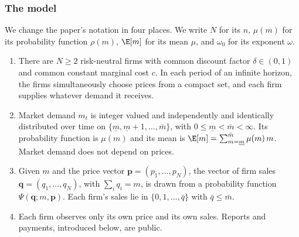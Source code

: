 \subsubsection{The model}

We change the paper's notation in four places. We write $N$ for its $n$, $\mu(m)$ for its probability function
$\rho(m)$, $\E[m]$ for its mean $\mu$, and $\omega_0$ for its exponent $\omega$.

\begin{assumption}[Environment]\label{asm:12-hs}
\leavevmode
\begin{enumerate}[label=(\roman*)]
\item There are $N \ge 2$ risk-neutral firms with common discount factor $\delta \in (0,1)$ and common constant
marginal cost $c$. In each period of an infinite horizon, the firms simultaneously choose prices from a compact
set, and each firm supplies whatever demand it receives.
\item Market demand $m_t$ is integer valued and independently and identically distributed over time on
$\{\underline m, \underline m + 1, \dots, \bar m\}$, with $0 \le \underline m < \bar m < \infty$. Its probability
function is $\mu(m)$ and its mean is $\E[m] = \sum_{m=\underline m}^{\bar m}\mu(m)\,m$. Market demand does not depend
on prices.
\item Given $m$ and the price vector $\mathbf{p} = (p_1,\dots,p_N)$, the vector of firm sales
$\mathbf{q} = (q_1, \dots, q_N)$, with $\sum_i q_i = m$, is drawn from a probability function
$\Psi(\mathbf{q}; m, \mathbf{p})$. Each firm's sales lie in $\{0, 1, \dots, \bar q\}$ with $\bar q \le \bar m$.
\item Each firm observes only its own price and its own sales. Reports and payments, introduced below, are public.
\end{enumerate}
\end{assumption}

